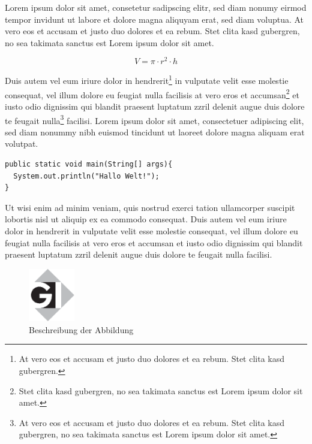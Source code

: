 \documentclass{akdai}
\theoremstyle{definition}
\begin{document}
Lorem ipsum dolor sit amet, consetetur sadipscing elitr, sed diam nonumy eirmod tempor invidunt ut 
labore et dolore magna aliquyam erat, sed diam voluptua. At vero eos et accusam et justo duo dolores 
et ea rebum. Stet clita kasd gubergren, no sea takimata sanctus est Lorem ipsum dolor sit amet. 
  

\begin{equation}
V= \pi \cdot r^{2} \cdot h
\end{equation}

Duis autem vel eum iriure dolor in hendrerit\footnote{At vero eos et accusam et justo duo dolores et 
ea rebum. Stet clita kasd gubergren.} in vulputate velit esse molestie consequat, vel illum dolore 
eu feugiat nulla facilisis at vero eros et accumsan\footnote{Stet clita kasd gubergren, no sea 
takimata sanctus est Lorem ipsum dolor sit amet.} et iusto odio dignissim qui blandit praesent 
luptatum zzril delenit augue duis dolore te feugait nulla\footnote{At vero eos et accusam et justo 
duo dolores et ea rebum. Stet clita kasd gubergren, no sea takimata sanctus est Lorem ipsum dolor 
sit amet.} facilisi. Lorem ipsum dolor sit amet, consectetuer adipiscing elit, sed diam nonummy nibh 
euismod tincidunt ut laoreet dolore magna aliquam erat volutpat. 


\begin{lstlisting}
public static void main(String[] args){
  System.out.println("Hallo Welt!");
}   
\end{lstlisting}



Ut wisi enim ad minim veniam, quis nostrud exerci tation 
ullamcorper suscipit lobortis nisl ut aliquip ex ea commodo consequat. Duis autem vel eum iriure 
dolor in hendrerit in vulputate velit esse molestie consequat, vel illum dolore eu feugiat nulla 
facilisis at vero eros et accumsan et iusto odio dignissim qui blandit praesent luptatum zzril 
delenit augue duis dolore te feugait nulla facilisi. 

\begin{figure}[htb]
  \begin{center}
    \includegraphics[width=2cm]{gilogo}
    \caption{\label{logo}Beschreibung der Abbildung}
  \end{center}
\end{figure}
\end{document}
